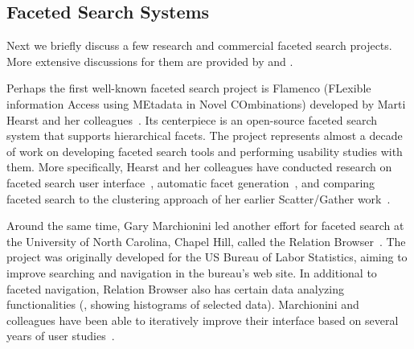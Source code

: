 
\subsection{Faceted Search Systems}
Next we briefly discuss a few research and commercial faceted search projects. More extensive discussions for them are provided by \citet{tunkelang2009faceted} and \citet{wei2013survey}.

Perhaps the first well-known faceted search project is Flamenco (FLexible information Access using MEtadata in Novel COmbinations) developed by Marti Hearst and her colleagues~\cite{hearst2000next}. Its centerpiece is an open-source faceted search system that supports hierarchical facets. The project represents almost a decade of work on developing faceted search tools and performing usability studies with them. More specifically, Hearst and her colleagues have conducted research on faceted search user interface~\cite{hearst2006design}, automatic facet generation~\cite{stoica2007automating}, and comparing faceted search to the clustering approach of her earlier Scatter/Gather work~\cite{hearst2006clustering}.

Around the same time, Gary Marchionini led another effort for faceted search at the University of North Carolina, Chapel Hill, called the Relation Browser~\cite{zhang2005evaluation,capra2008relation}. The project was originally developed for the US Bureau of Labor Statistics, aiming to improve searching and navigation in the bureau's web site. In additional to faceted navigation, Relation Browser also has certain data analyzing functionalities (\eg, showing histograms of selected data). Marchionini and colleagues have been able to iteratively improve their interface based on several years of user studies~\cite{marchionini2003towards,zhang2004relational}.

